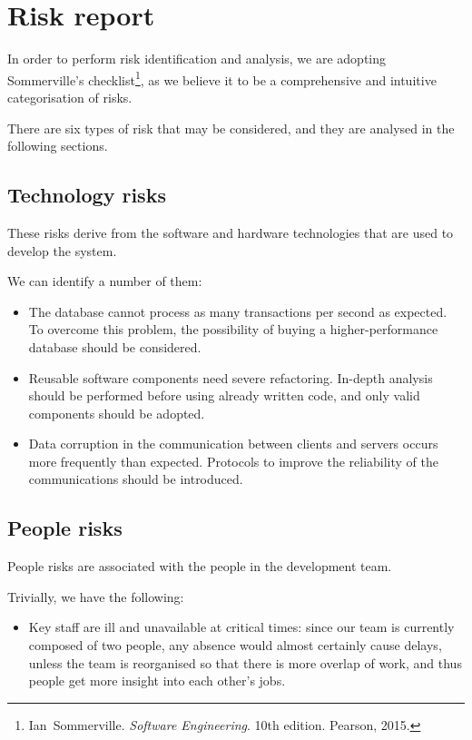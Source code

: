 \chapter{Risk report}\label{chap:risk}

In order to perform risk identification and analysis, we are adopting Sommerville's checklist\footnote{Ian~Sommerville. \emph{Software Engineering}. 10th edition. Pearson, 2015.}, as we believe it to be a comprehensive and intuitive categorisation of risks. 

There are six types of risk that may be considered, and they are analysed in the following sections.

\section{Technology risks}

These risks derive from the software and hardware technologies that are used to develop the system. 

We can identify a number of them:
\begin{itemize}
	\item The database cannot process as many transactions per second as expected. To overcome this problem, the possibility of buying a higher-performance database should be considered.
	\item Reusable software components need severe refactoring. In-depth analysis should be performed before using already written code, and only valid components should be adopted.
	\item Data corruption in the communication between clients and servers occurs more frequently than expected. Protocols to improve the reliability of the communications should be introduced.
\end{itemize}



\section{People risks}

People risks are associated with the people in the development team.

Trivially, we have the following:
\begin{itemize}
	\item Key staff are ill and unavailable at critical times: since our team is currently composed of two people, any absence would almost certainly cause delays, unless the team is reorganised so that there is more overlap of work, and thus people get more insight into each other's jobs.
\end{itemize}





